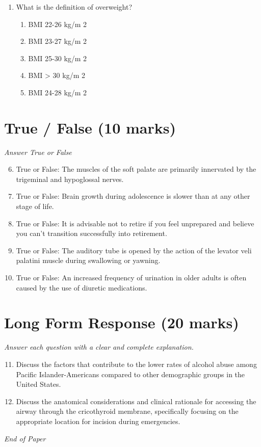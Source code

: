 \documentclass[12pt]{article}
\begin{document}
\begin{enumerate}[label=\arabic*.]
\begin{enumerate}[label=(\alph*)]
    \item the ligaments of the TMJ and the medial pterygoid muscle.
    \item the articular disc of the TMJ and the medial pterygoid muscle.
    \item the articular disc of the TMJ and the medial and lateral pterygoid muscles.
\end{enumerate}
\item What is the definition of overweight?
\begin{enumerate}[label=(\alph*)]
    \item BMI 22-26 kg/m 2
    \item BMI 23-27 kg/m 2
    \item BMI 25-30 kg/m 2
    \item BMI \textgreater{} 30 kg/m 2
    \item BMI 24-28 kg/m 2
\end{enumerate}
\end{enumerate}

\section*{True / False (10 marks)}
\textit{Answer True or False}
\begin{enumerate}[label=\arabic*.]
\setcounter{enumi}{5}
\item True or False: The muscles of the soft palate are primarily innervated by the trigeminal and hypoglossal nerves.
\item True or False: Brain growth during adolescence is slower than at any other stage of life.
\item True or False: It is advisable not to retire if you feel unprepared and believe you can't transition successfully into retirement.
\item True or False: The auditory tube is opened by the action of the levator veli palatini muscle during swallowing or yawning.
\item True or False: An increased frequency of urination in older adults is often caused by the use of diuretic medications.
\end{enumerate}

\section*{Long Form Response (20 marks)}
\textit{Answer each question with a clear and complete explanation.}
\begin{enumerate}[label=\arabic*.]
\setcounter{enumi}{10}
\item Discuss the factors that contribute to the lower rates of alcohol abuse among Pacific Islander-Americans compared to other demographic groups in the United States.
\item Discuss the anatomical considerations and clinical rationale for accessing the airway through the cricothyroid membrane, specifically focusing on the appropriate location for incision during emergencies.
\end{enumerate}

\vfill
\noindent\textit{End of Paper}
\end{document}
